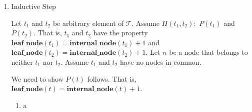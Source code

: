 \documentclass[12pt]{article}
\begin{document}
\begin{itemize}
\begin{mdframed}
\begin{enumerate}[1.]
            \item Inductive Step

            \bigskip

            Let $t_1$ and $t_2$ be arbitrary element of $\mathcal{T}$. Assume
            $H(t_1,t_2):$ $P(t_1)$ and $P(t_2)$. That is, $t_1$ and $t_2$ have
            the property $\textbf{leaf\_node}(t_1) = \textbf{internal\_node}(t_1) + 1$
            and $\textbf{leaf\_node}(t_2) = \textbf{internal\_node}(t_2) + 1$.
            Let $n$ be a node that belongs to neither $t_1$ nor $t_2$. Assume
            $t_1$ and $t_2$ have no nodes in common.

            \bigskip

            We need to show $P(t)$ follows. That is, $\textbf{leaf\_node}(t) =
            \textbf{internal\_node}(t) + 1$.

            \begin{enumerate}[1.]
                \item a
            \end{enumerate}
        \end{enumerate}
    \end{mdframed}
\end{itemize}
\end{document}
